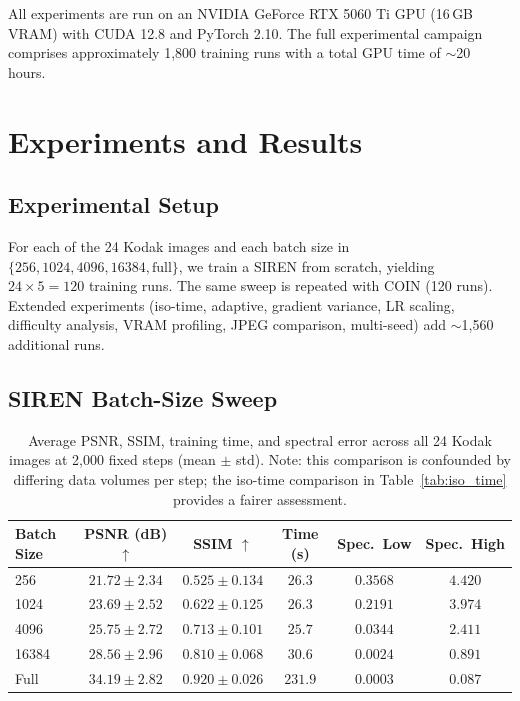 \documentclass[a4paper,oneside,11pt,english]{scrartcl}
\begin{document}
All experiments are run on an NVIDIA GeForce RTX 5060 Ti GPU (16\,GB VRAM)
with CUDA 12.8 and PyTorch 2.10.  The full experimental campaign comprises
approximately 1{,}800 training runs with a total GPU time of $\sim$20 hours.


\section{Experiments and Results}
\label{sec:experiments}

\subsection{Experimental Setup}

For each of the 24 Kodak images and each batch size in $\{256, 1024, 4096,
16384, \text{full}\}$, we train a SIREN from scratch, yielding $24 \times 5 = 120$
training runs.  The same sweep is repeated with COIN (120 runs).  Extended
experiments (iso-time, adaptive, gradient variance, LR scaling, difficulty
analysis, VRAM profiling, JPEG comparison, multi-seed) add $\sim$1{,}560
additional runs.

\subsection{SIREN Batch-Size Sweep}

\begin{table}[H]
\centering
\caption{Average PSNR, SSIM, training time, and spectral error across all 24
Kodak images at 2{,}000 fixed steps (mean $\pm$ std).
Note: this comparison is confounded by differing data volumes per step;
the iso-time comparison in Table~\ref{tab:iso_time} provides a fairer
assessment.}
\label{tab:main_results}
\begin{tabular}{lccccc}
\toprule
Batch Size & PSNR (dB) $\uparrow$ & SSIM $\uparrow$ & Time (s) & Spec.\ Low & Spec.\ High \\
\midrule
256    & $21.72 \pm 2.34$ & $0.525 \pm 0.134$ & $26.3$  & $0.3568$ & $4.420$ \\
1024   & $23.69 \pm 2.52$ & $0.622 \pm 0.125$ & $26.3$  & $0.2191$ & $3.974$ \\
4096   & $25.75 \pm 2.72$ & $0.713 \pm 0.101$ & $25.7$  & $0.0344$ & $2.411$ \\
16384  & $28.56 \pm 2.96$ & $0.810 \pm 0.068$ & $30.6$  & $0.0024$ & $0.891$ \\
Full   & $34.19 \pm 2.82$ & $0.920 \pm 0.026$ & $231.9$ & $0.0003$ & $0.087$ \\
\bottomrule
\end{tabular}
\end{table}
\end{document}
